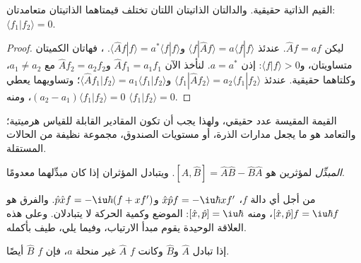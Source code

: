 \begin{theorem}\label{thm:b3:quantum-model-systems:hermitian-real}
القيم الذاتية  حقيقية. والدالتان الذاتيتان اللتان تختلف
قيمتاهما الذاتيتان متعامدتان: $\langle f_1|f_2\rangle = 0$.
\end{theorem}

\begin{proof}
ليكن $\hat Af = af$. عندئذ $\langle f|\hat Af\rangle = a\langle f|f\rangle$ 
و$\langle\hat Af|f\rangle = a^*\langle f|f\rangle$. ،
فهاتان الكميتان متساويتان، و$\langle f|f\rangle > 0$: إذن $a = a^*$. لنأخذ الآن $\hat Af_1
= a_1f_1$ و$\hat Af_2 = a_2f_2$ مع $a_1 \ne a_2$، وكلتاهما حقيقية. عندئذ
$\langle f_1|\hat Af_2\rangle = a_2\langle f_1|f_2\rangle$ و$\langle\hat Af_1|
f_2\rangle = a_1\langle f_1|f_2\rangle$؛ وتساويهما يعطي $(a_2 - a_1)
\langle f_1|f_2\rangle = 0$، ومنه $\langle f_1|f_2\rangle = 0$.
\end{proof}

القيمة المقيسة عدد حقيقي، ولهذا يجب أن تكون المقادير القابلة للقياس
هرميتية؛ والتعامد هو ما يجعل مدارات الذرة، أو مستويات الصندوق، مجموعة
نظيفة من الحالات المستقلة.

\begin{definition}[المبدِّل]\label{def:b3:quantum-model-systems:commutator}
\emph{المبدِّل} لمؤثرين هو $[\hat A,\hat B] =
\hat A\hat B - \hat B\hat A$. ويتبادل المؤثران إذا كان مبدِّلهما
معدومًا.
\end{definition}

\begin{example}\label{ex:b3:quantum-model-systems:canonical}
من أجل أي دالة $f$، $\hat x\hat pf = -\iu\hbar xf'$ و$\hat p\hat xf =
-\iu\hbar(f + xf')$. والفرق هو $[\hat x,\hat p]f = \iu\hbar f$، ومنه
$[\hat x,\hat p] = \iu\hbar$: الموضع وكمية الحركة لا يتبادلان. وعلى هذه
العلاقة الوحيدة يقوم مبدأ الارتياب، وفيما يلي، طيف 
بأكمله.
\end{example}

\begin{proposition}\label{prop:b3:quantum-model-systems:commuting}
إذا تبادل $\hat A$ و$\hat B$ وكانت $f$   $\hat A$
 غير منحلة $a$، فإن $f$  
$\hat B$ أيضًا.
\end{proposition}

